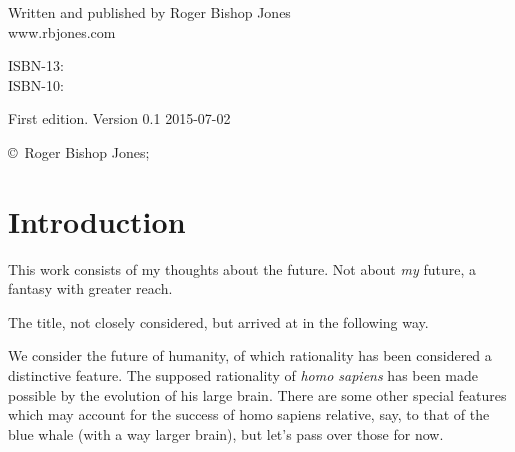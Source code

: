\begin{titlepage}
\maketitle

\hspace{2in}

\vfill

\begin{centering}

{\small

Written and published by Roger Bishop Jones\\
www.rbjones.com\\

\vspace{0.2in}

ISBN-13: \\
ISBN-10: 

\vspace{0.2in}

}%
{\scriptsize

First edition. \hfil Version 0.1 \hfil 2015-07-02

\vspace{0.2in}

\copyright\ Roger Bishop Jones;

}%

\end{centering}

\thispagestyle{empty}

\end{titlepage}

{\parskip=0pt\tableofcontents}



\mainmatter

\chapter{Introduction}

This work consists of my thoughts about the future.
Not about {\it my} future, a fantasy with greater reach.

The title, not closely considered, but arrived at in the following way.

We consider the future of humanity, of which rationality has been considered
a distinctive feature.
The supposed rationality of {\it homo sapiens} has been made possible by the
evolution of his large brain.
There are some other special features which may account for the success of 
homo sapiens relative, say, to that of the blue whale (with a way larger brain),
but let's pass over those for now.

